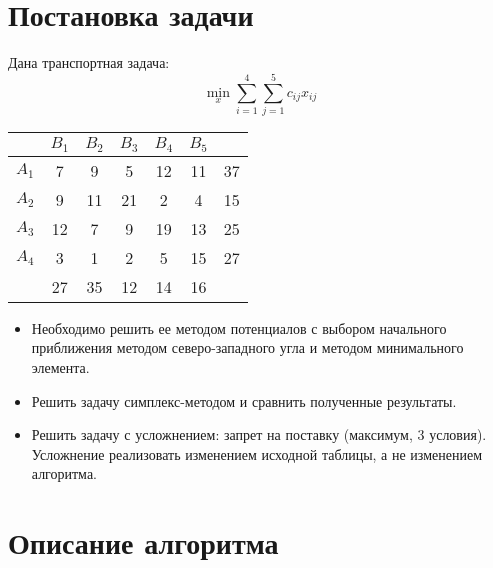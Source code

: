
\usepackage{amsmath}




\renewcommand\contentsname{\centerline{Содержание}}
\tableofcontents
\newpage

\section{Постановка задачи}
Дана транспортная задача:
\begin{equation*}
\min_x \sum_{i=1}^4 \sum_{j=1}^5 c_{ij} x_{ij}
\end{equation*}
\begin{table}[!ht]
	\centering
		\begin{tabular} {|c|c|c|c|c|c|c|}
			\hline
			 & $B_1$ & $B_2$ & $B_3$ & $B_4$ & $B_5$ & \\ \hline
			$A_1$ & 7 & 9 & 5 & 12 & 11 & 37 \\ \hline
			$A_2$ & 9 & 11 & 21 & 2 & 4 & 15 \\ \hline
			$A_3$ & 12 & 7 & 9 & 19 & 13 & 25 \\ \hline
			$A_4$ & 3 & 1 & 2 & 5 & 15 & 27 \\ \hline
			 & 27 & 35 & 12 & 14 & 16 & \\ \hline
		\end{tabular}
\end{table}
\begin{itemize}
	\item Необходимо решить ее методом потенциалов с выбором начального приближения методом северо-западного угла и методом минимального элемента.
	\item Решить задачу симплекс-методом и сравнить полученные результаты.
	\item Решить задачу с усложнением: запрет на поставку (максимум, 3 условия). Усложнение реализовать изменением исходной таблицы, а не изменением алгоритма.
\end{itemize}


\section{Описание алгоритма}
